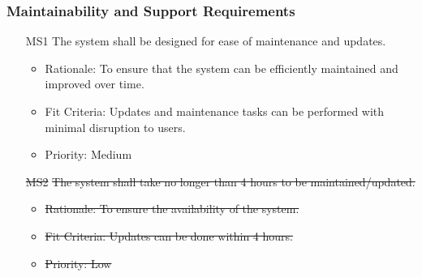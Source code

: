 \documentclass[12pt]{article}
\begin{document}
\subsubsection{Maintainability and Support Requirements}
\begin{itemize}
    \item[MS1] The system shall be designed for ease of maintenance and updates. \label{MS1}
    \begin{itemize}
        \item Rationale: To ensure that the system can be efficiently maintained and improved over time.
        \item Fit Criteria: Updates and maintenance tasks can be performed with minimal disruption to users.
        \item Priority: Medium
    \end{itemize}
\end{itemize}
\begin{itemize}
    \item[\sout{MS2}] \sout{The system shall take no longer than 4 hours to be maintained/updated.} \label{MS2}
    \begin{itemize}
        \item \sout{Rationale: To ensure the availability of the system.}
        \item \sout{Fit Criteria: Updates can be done within 4 hours.}
        \item \sout{Priority: Low}
    \end{itemize}
\end{itemize}
\end{document}
